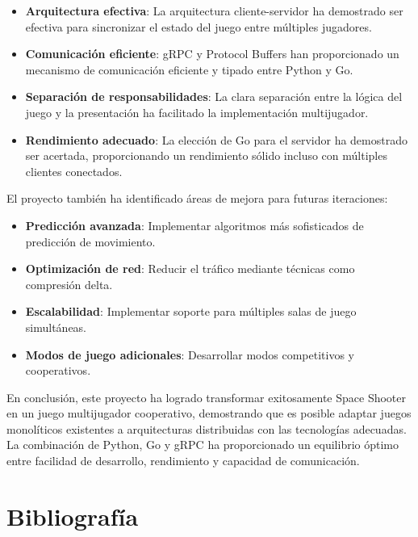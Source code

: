 \documentclass[11pt,letterpaper]{article}
\begin{document}
\begin{itemize}
    \item \textbf{Arquitectura efectiva}: La arquitectura cliente-servidor ha demostrado ser efectiva para sincronizar el estado del juego entre múltiples jugadores.
    
    \item \textbf{Comunicación eficiente}: gRPC y Protocol Buffers han proporcionado un mecanismo de comunicación eficiente y tipado entre Python y Go.
    
    \item \textbf{Separación de responsabilidades}: La clara separación entre la lógica del juego y la presentación ha facilitado la implementación multijugador.
    
    \item \textbf{Rendimiento adecuado}: La elección de Go para el servidor ha demostrado ser acertada, proporcionando un rendimiento sólido incluso con múltiples clientes conectados.
\end{itemize}

El proyecto también ha identificado áreas de mejora para futuras iteraciones:

\begin{itemize}
    \item \textbf{Predicción avanzada}: Implementar algoritmos más sofisticados de predicción de movimiento.
    
    \item \textbf{Optimización de red}: Reducir el tráfico mediante técnicas como compresión delta.
    
    \item \textbf{Escalabilidad}: Implementar soporte para múltiples salas de juego simultáneas.
    
    \item \textbf{Modos de juego adicionales}: Desarrollar modos competitivos y cooperativos.
\end{itemize}

En conclusión, este proyecto ha logrado transformar exitosamente Space Shooter en un juego multijugador cooperativo, demostrando que es posible adaptar juegos monolíticos existentes a arquitecturas distribuidas con las tecnologías adecuadas. La combinación de Python, Go y gRPC ha proporcionado un equilibrio óptimo entre facilidad de desarrollo, rendimiento y capacidad de comunicación.

\section{Bibliografía}
\end{document}
